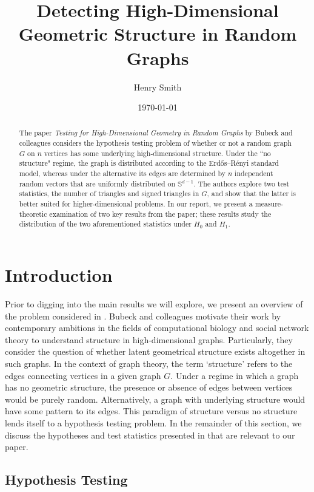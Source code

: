 \documentclass{article}
\title{\textbf{Detecting High-Dimensional Geometric Structure in Random Graphs}}
\author[]{Henry Smith}
\affil[]{\normalsize Yale University}
\date{\today}
\begin{document}
\maketitle

\begin{abstract}
    \noindent The paper \textit{Testing for High-Dimensional Geometry in Random Graphs} by Bubeck and colleagues considers the hypothesis testing problem of whether or not a random graph $G$ on $n$ vertices has some underlying high-dimensional structure. Under the ``no structure" regime, the graph is distributed according to the Erdős–Rényi standard model, whereas under the alternative its edges are determined by $n$ independent random vectors that are uniformly distributed on $\mathbb{S}^{d-1}$. The authors explore two test statistics, the number of triangles and signed triangles in $G$, and show that the latter is better suited for higher-dimensional problems. In our report, we present a measure-theoretic examination of two key results from the paper; these results study the distribution of the two aforementioned statistics under $H_0$ and $H_1$. \end{abstract}

\pagebreak

\section{\textbf{Introduction}}
Prior to digging into the main results we will explore, we present an overview of the problem considered in \cite{bubeck2016testing}. Bubeck and colleagues motivate their work by contemporary ambitions in the fields of computational biology and social network theory to understand structure in high-dimensional graphs. Particularly, they consider the question of whether latent geometrical structure exists altogether in such graphs. In the context of graph theory, the term `structure' refers to the edges connecting vertices in a given graph $G$. Under a regime in which a graph has no geometric structure, the presence or absence of edges between vertices would be purely random. Alternatively, a graph with underlying structure would have some pattern to its edges. This paradigm of structure versus no structure lends itself to a hypothesis testing problem. In the remainder of this section, we discuss the hypotheses and test statistics presented in \cite{bubeck2016testing} that are relevant to our paper.

\subsection{Hypothesis Testing}
\end{document}
